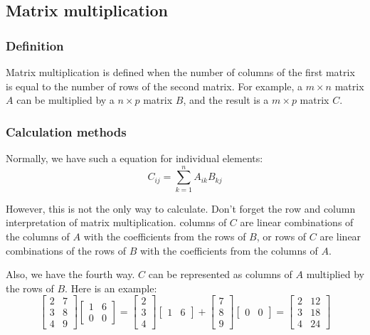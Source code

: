 \documentclass[12pt]{ctexart}
\begin{document}
\subsection{\textbf{Matrix multiplication}}
\subsubsection{\textbf{Definition}}

Matrix multiplication is defined when the number of columns of the first matrix is
equal to the number of rows of the second matrix. For example, a $m \times n$ matrix
$A$ can be multiplied by a $n \times p$ matrix $B$, and the result is a $m \times p$
matrix $C$.

\subsubsection{\textbf{Calculation methods}}

Normally, we have such a equation for individual elements:
\[
  C_{ij} = \sum_{k=1}^{n} A_{ik} B_{kj}
\]

However, this is not the only way to calculate. Don't forget the row and column
interpretation of matrix multiplication. columns of $C$ are linear combinations of
the columns of $A$ with the coefficients from the rows of $B$, or rows of $C$ are linear
combinations of the rows of $B$ with the coefficients from the columns of $A$.

Also, we have the fourth way. $C$ can be represented as columns of $A$ multiplied by
the rows of $B$. Here is an example:
\[
  \begin{bmatrix}
    2 & 7 \\ 3 & 8 \\ 4 & 9
  \end{bmatrix}
  \begin{bmatrix}
    1 & 6 \\ 0 & 0
  \end{bmatrix}
  =
  \begin{bmatrix}
    2 \\ 3 \\ 4
  \end{bmatrix}
  \begin{bmatrix}
    1 & 6
  \end{bmatrix}
  +
  \begin{bmatrix}
    7 \\ 8 \\9
  \end{bmatrix}
  \begin{bmatrix}
    0 & 0
  \end{bmatrix}
  =
  \begin{bmatrix}
    2 & 12 \\ 3 & 18 \\ 4 & 24
  \end{bmatrix}
\]
\end{document}
